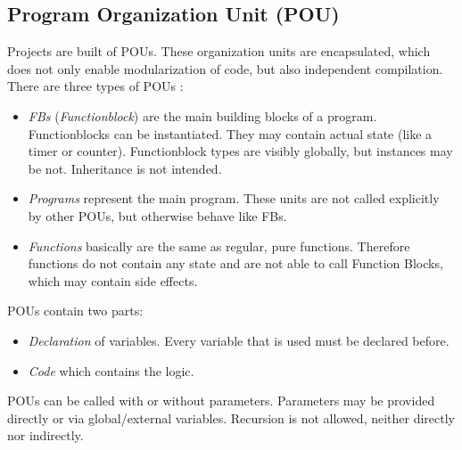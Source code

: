 \subsection{Program Organization Unit (POU)}
\label{sub:pou}
Projects are built of POUs. These organization units are encapsulated, which does not only enable modularization of code, but also independent compilation.
There are three types of POUs \cite{johnIEC611313Programming2010}:
\begin{itemize}
	\item \emph{FBs} (\emph{Functionblock}) are the main building blocks of a program. Functionblocks can be instantiated. They may contain actual state (like a timer or counter). Functionblock types are visibly globally, but instances may be not. Inheritance is not intended.
	\item \emph{Programs} represent the main program. These units are not called explicitly by other POUs, but otherwise behave like FBs.
	\item \emph{Functions} basically are the same as regular, pure functions. Therefore functions do not contain any state and are not able to call Function Blocks, which may contain side effects. 
\end{itemize}
POUs contain two parts:
\begin{itemize}
	\item \emph{Declaration} of variables. Every variable that is used must be declared before.
	\item \emph{Code} which contains the logic. 
\end{itemize}
POUs can be called with or without parameters. Parameters may be provided directly or via global/external variables.
Recursion is not allowed, neither directly nor indirectly. 


